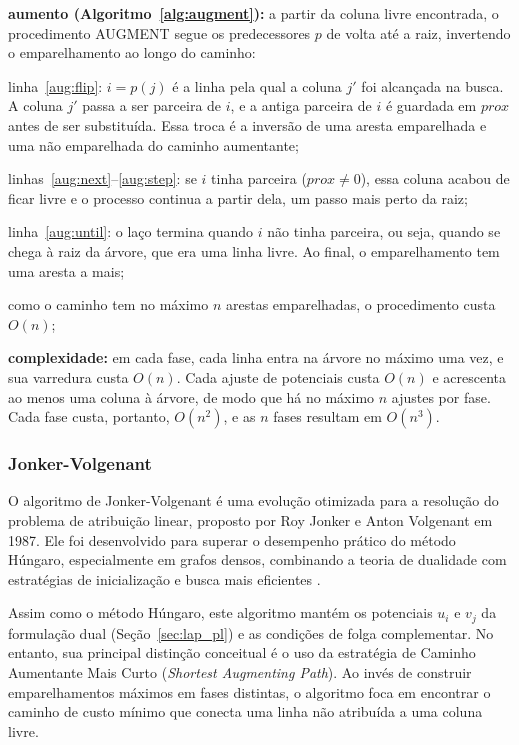 \begin{alineas}
    \item \textbf{aumento (Algoritmo~\ref{alg:augment}):} a partir da coluna livre encontrada, o procedimento AUGMENT segue os predecessores $p$ de volta até a raiz, invertendo o emparelhamento ao longo do caminho:
    \begin{alineas}
        \item linha~\ref{aug:flip}: $i = p(j)$ é a linha pela qual a coluna $j'$ foi alcançada na busca. A coluna $j'$ passa a ser parceira de $i$, e a antiga parceira de $i$ é guardada em $prox$ antes de ser substituída. Essa troca é a inversão de uma aresta emparelhada e uma não emparelhada do caminho aumentante;
        \item linhas~\ref{aug:next}--\ref{aug:step}: se $i$ tinha parceira ($prox \neq 0$), essa coluna acabou de ficar livre e o processo continua a partir dela, um passo mais perto da raiz;
        \item linha~\ref{aug:until}: o laço termina quando $i$ não tinha parceira, ou seja, quando se chega à raiz da árvore, que era uma linha livre. Ao final, o emparelhamento tem uma aresta a mais;
        \item como o caminho tem no máximo $n$ arestas emparelhadas, o procedimento custa $O(n)$;
    \end{alineas}
    \item \textbf{complexidade:} em cada fase, cada linha entra na árvore no máximo uma vez, e sua varredura custa $O(n)$. Cada ajuste de potenciais custa $O(n)$ e acrescenta ao menos uma coluna à árvore, de modo que há no máximo $n$ ajustes por fase. Cada fase custa, portanto, $O(n^2)$, e as $n$ fases resultam em $O(n^3)$.
\end{alineas}

\subsubsection{Jonker-Volgenant} 

O algoritmo de Jonker-Volgenant é uma evolução otimizada para a resolução do problema de atribuição linear, proposto por Roy Jonker e Anton Volgenant em 1987. Ele foi desenvolvido para superar o desempenho prático do método Húngaro, especialmente em grafos densos, combinando a teoria de dualidade com estratégias de inicialização e busca mais eficientes \cite{jonker}.

Assim como o método Húngaro, este algoritmo mantém os potenciais $u_i$ e $v_j$ da formulação dual (Seção~\ref{sec:lap_pl}) e as condições de folga complementar. No entanto, sua principal distinção conceitual é o uso da estratégia de Caminho Aumentante Mais Curto (\textit{Shortest Augmenting Path}). Ao invés de construir emparelhamentos máximos em fases distintas, o algoritmo foca em encontrar o caminho de custo mínimo que conecta uma linha não atribuída a uma coluna livre.

